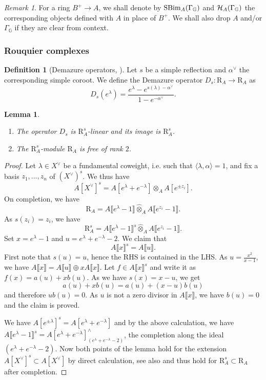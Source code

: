 \documentclass[a4paper, 10pt, oneside, reqno]{amsart}
\theoremstyle{plain}
\newtheorem{lem}[thm]{Lemma}
\theoremstyle{definition}
\newtheorem{defi}[thm]{Definition}
\theoremstyle{remark}
\newtheorem{rque}[thm]{Remark}
\newcommand{\Gbb}{\mathbb{G}}
\newcommand{\RR}{\mathrm{R}}
\begin{document}
\begin{rque}
For a ring $B^+ \to A$, we shall denote by $\SBim_{A}(\Gamma_{\Gbb})$ and $\Hcal_A(\Gamma_{\Gbb})$ the corresponding objects defined with $A$ in place of $B^+$. We shall also drop $A$ and/or $\Gamma_{\Gbb}$ if they are clear from context. 
\end{rque}

\subsubsection{Rouquier complexes}

\begin{defi}[Demazure operators, \cite{Demazure}]
Let $s$ be a simple reflection and $\alpha^{\vee}$ the corresponding simple coroot. 
We define the Demazure operator $D_s : \RR_A \to \RR_A$ as 
$$D_s(e^{\lambda}) = \frac{e^{\lambda} - e^{s(\lambda) - \alpha^{\vee}}}{1 - e^{-\alpha^{\vee}}}.$$
\end{defi}

\begin{lem}\label{lem:frobenius-extension}
\begin{enumerate}
\item The operator $D_s$ is $\RR_A^s$-linear and its image is $\RR_A^s$.
\item The $\RR_A^s$-module $\RR_A$ is free of rank $2$.
\end{enumerate}
\end{lem}

\begin{proof}
Let $\lambda \in X^{\vee}$ be a fundamental coweight, i.e. such that $\langle \lambda, \alpha\rangle = 1$, and fix a basis $z_1, \dots, z_n$ of $(X^{\vee})^s$. We thus have 
$$A[X^{\vee}]^s = A[e^{\lambda} + e^{-\lambda}] \otimes_A A[e^{\pm z_i}].$$
On completion, we have 
$$\RR_A = A\llbracket e^{\lambda} - 1\rrbracket \widehat{\otimes}_A A\llbracket e^{z_i} - 1 \rrbracket.$$
As $s(z_i) = z_i$, we have 
$$\RR_A^s = A\llbracket e^{\lambda} - 1\rrbracket^s \widehat{\otimes}_A A\llbracket e^{z_i} - 1 \rrbracket.$$
Set $x = e^{\lambda} - 1$ and $u = e^{\lambda} + e^{-\lambda} - 2$. We claim that 
$$A\llbracket x\rrbracket^s = A\llbracket u \rrbracket.$$ 
First note that $s(u) = u$, hence the RHS is contained in the LHS. As $u = \frac{x^2}{x-1}$, we have $A\llbracket x \rrbracket = A\llbracket u \rrbracket \oplus xA\llbracket x \rrbracket$. Let $f \in A\llbracket x \rrbracket^s$ and write it as $f(x) = a(u) + xb(u)$. As we have $s(x) = x-u$, we get 
$$a(u) + xb(u) = a(u) + (x-u)b(u)$$
and therefore $ub(u) = 0$. As $u$ is not a zero divisor in $A\llbracket x\rrbracket$, we have $b(u) = 0$ and the claim is proved. 

We have $A[e^{\pm\lambda}]^s = A[e^{\lambda} + e^{-\lambda}]$ and by the above calculation, we have $A\llbracket e^{\lambda} - 1 \rrbracket^s = A[e^{\lambda} + e^{-\lambda}]^{\wedge}_{(e^{\lambda} + e^{-\lambda} - 2)}$, the completion along the ideal $(e^{\lambda} + e^{-\lambda} - 2)$. Now both points of the lemma hold for the extension $A[X^{\vee}]^s \subset A[X^{\vee}]$ by direct calculation, see also \cite[Section 2.5]{EteveEberhardt} and thus hold for $\RR^s_A \subset \RR_A$ after completion. 
\end{proof}
\end{document}
